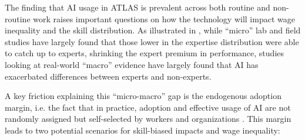 \documentclass[11pt,a4paper]{article}
\begin{document}
The finding that AI usage in ATLAS is prevalent across both routine and non-routine work raises important questions on how the technology will impact wage inequality and the skill distribution. As illustrated in \citet{imas2026who}, while ``micro'' lab and field studies have largely found that those lower in the expertise distribution were able to catch up to experts, shrinking the expert premium in performance, studies looking at real-world ``macro'' evidence have largely found that AI has exacerbated differences between experts and non-experts.

A key friction explaining this ``micro-macro'' gap is the endogenous adoption margin, i.e. the fact that in practice, adoption and effective usage of AI are not randomly assigned but self-selected by workers and organizations \citep{imas2026who}. This margin leads to two potential scenarios for skill-biased impacts and wage inequality:
\end{document}
